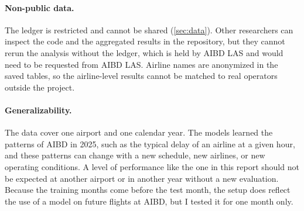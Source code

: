 \paragraph{Non-public data.} The ledger is restricted and cannot be shared (\cref{sec:data}). Other researchers can inspect the code and the aggregated results in the repository, but they cannot rerun the analysis without the ledger, which is held by AIBD LAS and would need to be requested from AIBD LAS. Airline names are anonymized in the saved tables, so the airline-level results cannot be matched to real operators outside the project.

\paragraph{Generalizability.} The data cover one airport and one calendar year. The models learned the patterns of AIBD in 2025, such as the typical delay of an airline at a given hour, and these patterns can change with a new schedule, new airlines, or new operating conditions. A level of performance like the one in this report should not be expected at another airport or in another year without a new evaluation. Because the training months come before the test month, the setup does reflect the use of a model on future flights at AIBD, but I tested it for one month only.
